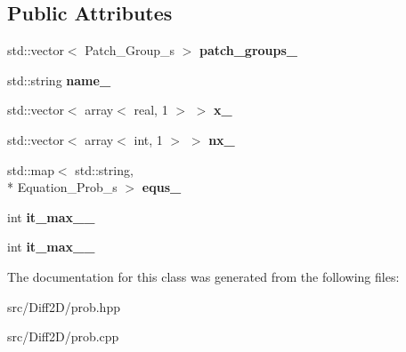 \subsection*{Public Attributes}
\begin{DoxyCompactItemize}
\item 
\hypertarget{classProb_a63da8c35707c884a7f2960b18e8b5e30}{std\-::vector$<$ Patch\-\_\-\-Group\-\_\-s $>$ {\bfseries patch\-\_\-groups\-\_\-}}\label{classProb_a63da8c35707c884a7f2960b18e8b5e30}

\item 
\hypertarget{classProb_af34172c6eced00a603e92e0cf17e4953}{std\-::string {\bfseries name\-\_\-}}\label{classProb_af34172c6eced00a603e92e0cf17e4953}

\item 
\hypertarget{classProb_ac18ce288649f196b15137b88bfe374de}{std\-::vector$<$ array$<$ real, 1 $>$ $>$ {\bfseries x\-\_\-}}\label{classProb_ac18ce288649f196b15137b88bfe374de}

\item 
\hypertarget{classProb_a663e2f9aca6788b1dc06c3ff468b3e55}{std\-::vector$<$ array$<$ int, 1 $>$ $>$ {\bfseries nx\-\_\-}}\label{classProb_a663e2f9aca6788b1dc06c3ff468b3e55}

\item 
\hypertarget{classProb_ac78ec4ce0542942cbfdb62e2737b149e}{std\-::map$<$ std\-::string, \\*
Equation\-\_\-\-Prob\-\_\-s $>$ {\bfseries equs\-\_\-}}\label{classProb_ac78ec4ce0542942cbfdb62e2737b149e}

\item 
\hypertarget{classProb_ab683dae1ead4955162ebe4a2194f8a35}{int {\bfseries it\-\_\-max\-\_\-\_\-}}\label{classProb_ab683dae1ead4955162ebe4a2194f8a35}

\item 
\hypertarget{classProb_ac344ce6492eb0d3f8b6655aa914982d7}{int {\bfseries it\-\_\-max\-\_\-\_\-}}\label{classProb_ac344ce6492eb0d3f8b6655aa914982d7}

\end{DoxyCompactItemize}


The documentation for this class was generated from the following files\-:\begin{DoxyCompactItemize}
\item 
src/\-Diff2\-D/prob.\-hpp\item 
src/\-Diff2\-D/prob.\-cpp\end{DoxyCompactItemize}
